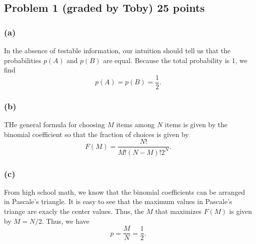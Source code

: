 \documentclass[11pt]{article}
\begin{document}
\lstset{language=Matlab,%
  breaklines=true,%
  morekeywords={matlab2tikz},
  keywordstyle=\color{blue},%
  morekeywords=[2]{1}, keywordstyle=[2]{\color{black}},
  identifierstyle=\color{black},%
  stringstyle=\color{mylilas},
  commentstyle=\color{mygreen},%
  showstringspaces=false,%
  numbers=left,%
  numberstyle={\tiny \color{black}},%
  numbersep=9pt, %
  emph=[1]{for,end,break},emphstyle=[1]\color{red}, %
}


\subsection*{Problem 1 (graded by Toby) 25 points}

\subsubsection*{(a)}

In the absence of testable information, our intuition should tell us that the probabilities $p(A)$ and $p(B)$ are equal. Because the total probability is $1$, we find
\begin{equation}
p(A) = p(B) = \frac{1}{2}.
\end{equation}

\subsubsection*{(b)}

THe general formula for choosing $M$ items among $N$ items is given by the binomial coefficient so that the fraction of choices is given by
\begin{equation}
F(M) = \frac{N!}{M!(N-M)!2^N}.
\end{equation}

\subsubsection*{(c)}

From high school math, we know that the binomial coefficients can be arranged in Pascale's triangle. It is easy to see that the maximum values in Pascale's triange are exacly the center values. Thus, the $M$ that maximizes $F(M)$ is given by $M=N/2$. Thus, we have
\begin{equation}
p = \frac{M}{N} = \frac{1}{2}.
\end{equation}
\end{document}
